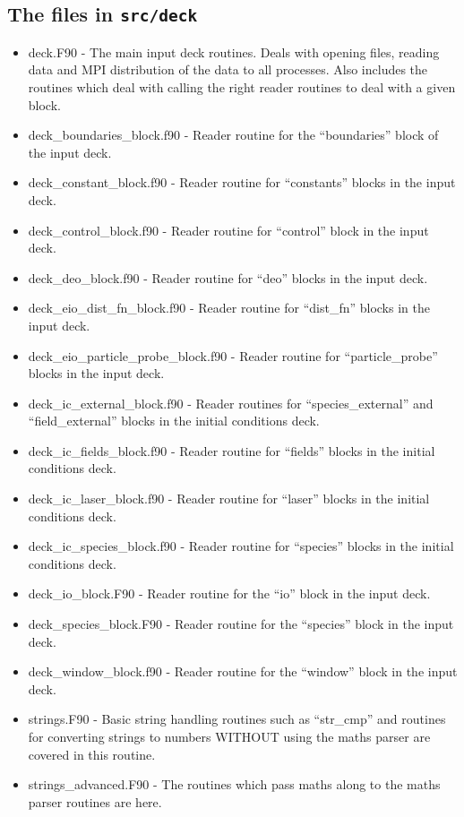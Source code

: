\documentclass[12pt,a4paper]{article}
\newcommand{\inlinecode}[1]{{\color{warwickred} \bf\texttt{#1}}}
\begin{document}
\subsection{The files in \inlinecode{src/deck}}
\begin{itemize}
\item deck.F90 - The main input deck routines. Deals with opening files,
  reading data and MPI distribution of the data to all processes. Also
  includes the routines which deal with calling the right reader routines to
  deal with a given block.
\item deck\_boundaries\_block.f90 - Reader routine for the ``boundaries'' block
  of the input deck.
\item deck\_constant\_block.f90 - Reader routine for ``constants'' blocks in the
  input deck.
\item deck\_control\_block.f90 - Reader routine for ``control'' block in the
  input deck.
\item deck\_deo\_block.f90 - Reader routine for ``deo'' blocks in the input
  deck.
\item deck\_eio\_dist\_fn\_block.f90 - Reader routine for ``dist\_fn'' blocks in
  the input deck.
\item deck\_eio\_particle\_probe\_block.f90 - Reader routine for
  ``particle\_probe'' blocks in the input deck.
\item deck\_ic\_external\_block.f90 - Reader routines for ``species\_external''
  and ``field\_external'' blocks in the initial conditions deck.
\item deck\_ic\_fields\_block.f90 - Reader routine for ``fields'' blocks in the
  initial conditions deck.
\item deck\_ic\_laser\_block.f90 - Reader routine for ``laser'' blocks in the
  initial conditions deck.
\item deck\_ic\_species\_block.f90 - Reader routine for ``species'' blocks in
  the initial conditions deck.
\item deck\_io\_block.F90 - Reader routine for the ``io'' block in the input
  deck.
\item deck\_species\_block.F90 - Reader routine for the ``species'' block in the
  input deck.
\item deck\_window\_block.f90 - Reader routine for the ``window'' block in the
  input deck.
\item strings.F90 - Basic string handling routines such as ``str\_cmp'' and
  routines for converting strings to numbers WITHOUT using the maths parser
  are covered in this routine.
\item strings\_advanced.F90 - The routines which pass maths along to the maths
  parser routines are here.
\end{itemize}
\end{document}
